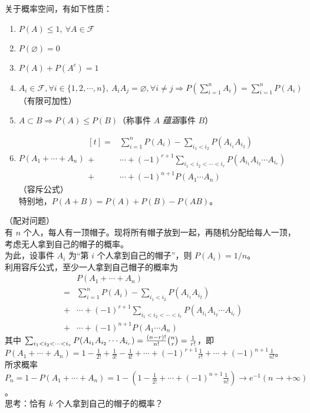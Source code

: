 \documentclass[../main.tex]{subfiles}
\begin{document}
\begin{proposition}
    关于概率空间，有如下性质：
    \begin{enumerate}
        \item $P(A)\leq 1,\ \forall A\in\mathcal{F}$
        \item $P(\varnothing)=0$
        \item $P(A)+P(A^c)=1$
        \item $A_i\in\mathcal{F},\forall i\in\{1,2,\cdots,n\},\ A_iA_j=\varnothing,\forall i\neq j\Rightarrow P(\sum_{i=1}^n A_i)=\sum_{i=1}^n P(A_i)$（有限可加性）
        \item $A\subset B\Rightarrow P(A)\leq P(B)$（称事件 $A$ \emph{蕴涵}事件 $B$）
        \item $P(A_1+\cdots+A_n)  \begin{aligned}[t]
                      = & \sum_{i=1}^n P(A_i)-\sum_{i_1<i_2}P(A_{i_1}A_{i_2})                       \\
                      + & \cdots+(-1)^{r+1}\sum_{i_1<i_2<\cdots<i_r}P(A_{i_1}A_{i_2}\cdots A_{i_r}) \\
                      + & \cdots+(-1)^{n+1}P(A_1\cdots A_n)
                  \end{aligned}$（容斥公式）\\
              特别地，$P(A+B)=P(A)+P(B)-P(AB)$。
    \end{enumerate}
\end{proposition}

\begin{example}
    （配对问题）\\
    有 $n$ 个人，每人有一顶帽子。现将所有帽子放到一起，再随机分配给每人一顶，考虑无人拿到自己的帽子的概率。\\
    为此，设事件 $A_i$ 为“第 $i$ 个人拿到自己的帽子”，则 $P(A_i)=1/n$。\\
    利用容斥公式，至少一人拿到自己帽子的概率为
    \begin{equation*}
        \begin{aligned}
              & P(A_1+\cdots+A_n)                                                         \\
            = & \sum_{i=1}^n P(A_i)-\sum_{i_1<i_2}P(A_{i_1}A_{i_2})                       \\
            + & \cdots+(-1)^{r+1}\sum_{i_1<i_2<\cdots<i_r}P(A_{i_1}A_{i_2}\cdots A_{i_r}) \\
            + & \cdots+(-1)^{n+1}P(A_1\cdots A_n)
        \end{aligned}
    \end{equation*}
    其中 $\sum_{i_1<i_2<\cdots<i_r}P(A_{i_1}A_{i_2}\cdots A_{i_r})=\frac{(n-r)!}{n!}\tbinom{n}{r}=\frac{1}{r!}$，即 $P(A_1+\cdots+A_n)=1-\frac{1}{2!}+\frac{1}{3!}-\frac{1}{4!}+\cdots+(-1)^{r+1}\frac{1}{r!}+\cdots+(-1)^{n+1}\frac{1}{n!}$。\\
    所求概率 $P_n=1-P(A_1+\cdots+A_n)=1-(1-\frac{1}{2!}+\cdots+(-1)^{n+1}\frac{1}{n!})\rightarrow e^{-1}(n\rightarrow+\infty)$。\\
    思考：恰有 $k$ 个人拿到自己的帽子的概率？
\end{example}
\end{document}
